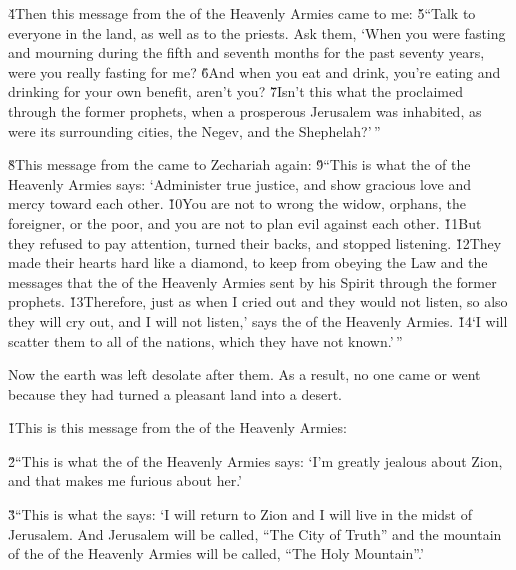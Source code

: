 \v{4}Then this message from the  of the Heavenly Armies came to me: \v{5}``Talk to everyone in the land, as well as to the priests. Ask them, `When you were fasting and mourning during the fifth and seventh months for the past seventy years, were you really fasting for me? \v{6}And when you eat and drink, you're eating and drinking for your own benefit, aren't you? \v{7}Isn't this what the  proclaimed through the former prophets, when a prosperous Jerusalem was inhabited, as were its surrounding cities, the Negev, and the Shephelah?'\,''

\v{8}This message from the  came to Zechariah again: \v{9}``This is what the  of the Heavenly Armies says: `Administer true justice, and show gracious love and mercy toward each other. \v{10}You are not to wrong the widow, orphans, the foreigner, or the poor, and you are not to plan evil against each other. \v{11}But they refused to pay attention, turned their backs, and stopped listening. \v{12}They made their hearts hard like a diamond, to keep from obeying the Law and the messages that the  of the Heavenly Armies sent by his Spirit through the former prophets. \v{13}Therefore, just as when I cried out and they would not listen, so also they will cry out, and I will not listen,' says the  of the Heavenly Armies. \v{14}`I will scatter them to all of the nations, which they have not known.'\,''

Now the earth was left desolate after them. As a result, no one came or went because they had turned a pleasant land into a desert.

\v{1}This is this message from the  of the Heavenly Armies:

\v{2}``This is what the  of the Heavenly Armies says: `I'm greatly jealous about Zion, and that makes me furious about her.'

\v{3}``This is what the  says: `I will return to Zion and I will live in the midst of Jerusalem. And Jerusalem will be called, ``The City of Truth'' and the mountain of the  of the Heavenly Armies will be called, ``The Holy Mountain''.'

